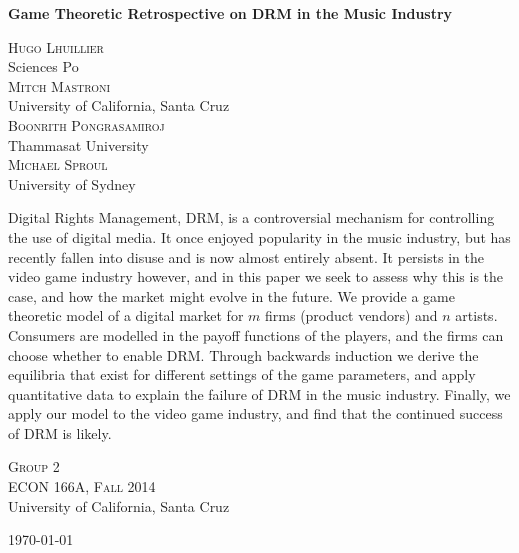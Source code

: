 \documentclass[a4paper,12pt]{article}
\numberwithin{equation}{section}
\renewenvironment{abstract}
 {\normalsize
  \begin{center}
  \bfseries \abstractname\vspace{-.5em}\vspace{0pt}
  \end{center}
  \list{}{%
    \setlength{\leftmargin}{20mm}%
    \setlength{\rightmargin}{\leftmargin}%
  }%
  \item\relax}
 {\endlist}
\begin{document}
\begin{titlepage}
\begin{center}

\vspace*{3cm}
\Large
\begin{changemargin}{2cm}{2cm}
\begin{center}
\textbf{Game Theoretic Retrospective on DRM in the Music Industry}
\end{center}
\end{changemargin}

\vspace*{0.5cm}
\large
\textsc{Hugo Lhuillier}\\
Sciences Po\\[1.2em]
\textsc{Mitch Mastroni}\\
University of California, Santa Cruz\\[1.2em]
\textsc{Boonrith Pongrasamiroj}\\
Thammasat University\\[1.2em]
\textsc{Michael Sproul}\\
University of Sydney

\vspace*{1cm}
\begin{abstract}
Digital Rights Management, DRM, is a controversial mechanism for controlling the use of digital media. It once enjoyed popularity in the music industry, but has recently fallen into disuse and is now almost entirely absent. It persists in the video game industry however, and in this paper we seek to assess why this is the case, and how the market might evolve in the future. We provide a game theoretic model of a digital market for $m$ firms (product vendors) and $n$ artists. Consumers are modelled in the payoff functions of the players, and the firms can choose whether to enable DRM. Through backwards induction we derive the equilibria that exist for different settings of the game parameters, and apply quantitative data to explain the failure of DRM in the music industry. Finally, we apply our model to the video game industry, and find that the continued success of DRM is likely.
\end{abstract}

\vfill

\normalsize
\textsc{Group 2}\\[1.2em]
\textsc{ECON 166A, Fall 2014}\\
University of California, Santa Cruz

\today

\end{center}
\end{titlepage}
\pagebreak
\end{document}
